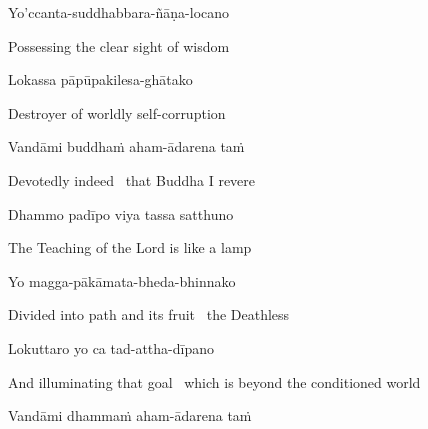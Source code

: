 Yo'ccanta-suddhabbara-ñāṇa-locano

\begin{english}
  Possessing the clear sight of wisdom
\end{english}

Lokassa pāpūpakilesa-ghātako

\begin{english}
  Destroyer of worldly self-corruption
\end{english}

Vandāmi buddhaṁ aham-ādarena taṁ

\begin{english}
  Devotedly indeed \breathmark\ that Buddha I revere
\end{english}

Dhammo padīpo viya tassa satthuno

\begin{english}
    The Teaching of the Lord is like a lamp\makeatletter\hyperlink{endnote8-appendix}\makeatother

\end{english}

Yo magga-pākāmata-bheda-bhinnako

\begin{english}
    Divided into path and its fruit \breathmark\ the Deathless\makeatletter\hyperlink{endnote9-appendix}\makeatother

\end{english}

Lokuttaro yo ca tad-attha-dīpano

\begin{english}
    And illuminating that goal \breathmark\ which is beyond the conditioned world\makeatletter\hyperlink{endnote10-appendix}\makeatother

\end{english}

Vandāmi dhammaṁ aham-ādarena taṁ


